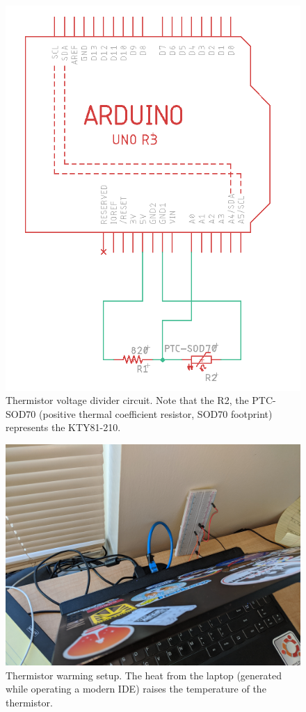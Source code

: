 \documentclass[12pt]{article}
\begin{document}
\begin{figure}[H]
    \centering
    \includegraphics[width=\linewidth]{sch.png}
    \caption{Thermistor voltage divider circuit. Note that the R2, the PTC-SOD70 (positive thermal 
    coefficient resistor, SOD70 footprint) represents the KTY81-210.}
    \label{fig:sch}
\end{figure}

\begin{figure}[H]
    \centering
    \includegraphics[width=0.7\linewidth]{warming.jpg}
    \caption{Thermistor warming setup. The heat from the laptop (generated while operating a modern 
    IDE) raises the temperature of the thermistor.}
    \label{fig:warming}
\end{figure}
\end{document}
